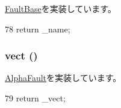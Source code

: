\hyperlink{classFaultBase_aad960357563b8b969d2dffdcc6861de7}{FaultBase}を実装しています。


\begin{DoxyCode}
78 {return _name;}
\end{DoxyCode}
\hypertarget{classAlphaISA_1_1AlignmentFault_ae15c5d7ab0162821b93d668d0b225198}{
\subsubsection[{vect}]{ vect ()}}
\label{classAlphaISA_1_1AlignmentFault_ae15c5d7ab0162821b93d668d0b225198}


\hyperlink{classAlphaISA_1_1AlphaFault_ac141ef2ab527bd4d5c079ddff2e8b4aa}{AlphaFault}を実装しています。


\begin{DoxyCode}
79 {return _vect;}
\end{DoxyCode}


